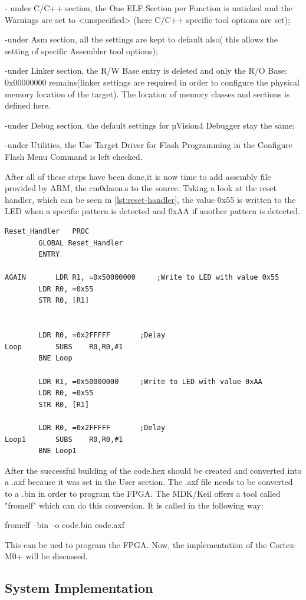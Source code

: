 - under C/C++ section, the One ELF Section per Function is unticked and the Warnings are set to <unspecified> (here C/C++ specific tool options are set);

-under Asm section, all the settings are kept to default also( this allows the setting of specific Assembler tool options);

-under Linker section, the R/W Base entry is deleted and only the R/O Base: 0x00000000 remains(linker settings are required in order to configure the physical memory location of the target). The location of memory classes and sections is defined here.

-under Debug section, the default settings for µVision4 Debugger stay the same;

-under Utilities, the Use Target Driver for Flash Programming in the Configure Flash Menu Command is left checked.

After all of these steps have been done,it is now time to add assembly file provided by ARM, the cm0dasm.s to the source. Taking a look at the reset handler, which can be seen in \ref{lst:reset-handler},  the value 0x55 is written to the LED when a specific pattern is detected and 0xAA if another pattern is detected.

\begin{lstlisting}[caption={Reset Handler},label={lst:reset-handler}]
Reset_Handler	PROC
		GLOBAL Reset_Handler
		ENTRY

AGAIN		LDR	R1, =0x50000000		;Write to LED with value 0x55
		LDR	R0, =0x55
		STR	R0, [R1]


		LDR	R0, =0x2FFFFF		;Delay
Loop		SUBS	R0,R0,#1
		BNE Loop

		LDR	R1, =0x50000000		;Write to LED with value 0xAA
		LDR	R0, =0x55
		STR	R0, [R1]

		LDR	R0, =0x2FFFFF		;Delay
Loop1		SUBS	R0,R0,#1
		BNE Loop1
\end{lstlisting}


After the successful building of the code.hex should be created and converted into a .axf because it was set in the User section. The .axf file needs to be converted to a .bin in order to program the FPGA. The MDK/Keil offers a tool called "fromelf" which can do this conversion. It is called in the following way:

fromelf --bin --o code.bin code.axf

This can be ued to program the FPGA. Now, the implementation of the Cortex-M0+ will be discussed.

\subsection{System Implementation}

